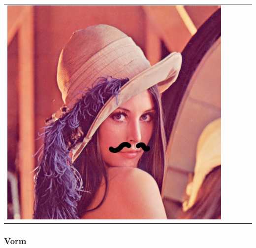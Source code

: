 \documentclass{beamer}
\begin{document}
\begin{frame}
\begin{tabular}{ccccc}
    \includegraphics[scale=.1]{../images/64.jpg}
  \end{tabular}

\end{frame}

\begin{frame}[fragile]
  \frametitle{Vorm}

  

\end{frame}


\end{document}
